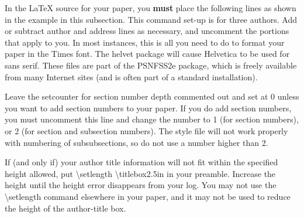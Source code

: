 \documentclass[letterpaper]{article} %
\begin{document}
In the \LaTeX{} source for your paper, you \textbf{must} place the following lines as shown in the example in this subsection. This command set-up is for three authors. Add or subtract author and address lines as necessary, and uncomment the portions that apply to you. In most instances, this is all you need to do to format your paper in the Times font. The helvet package will cause Helvetica to be used for sans serif. These files are part of the PSNFSS2e package, which is freely available from many Internet sites (and is often part of a standard installation).

Leave the setcounter for section number depth commented out and set at 0 unless you want to add section numbers to your paper. If you do add section numbers, you must uncomment this line and change the number to 1 (for section numbers), or 2 (for section and subsection numbers). The style file will not work properly with numbering of subsubsections, so do not use a number higher than 2.

If (and only if) your author title information will not fit within the specified height allowed, put \textbackslash setlength \textbackslash titlebox{2.5in} in your preamble. Increase the height until the height error disappears from your log. You may not use the \textbackslash setlength command elsewhere in your paper, and it may not be used to reduce the height of the author-title box.
\end{document}
